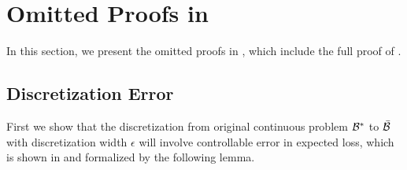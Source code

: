 
\section{Omitted Proofs in }

In this section, we present the omitted proofs in , which include the full proof of .

\subsection{Discretization Error}\label{app:discrete-error}
First we show that the discretization from original continuous problem ${\mathcal{B}}^*$ to $\bar{{\mathcal{B}}}$ with discretization width $\epsilon$ will involve controllable error in expected loss, which is shown in  and formalized by the following lemma. 

